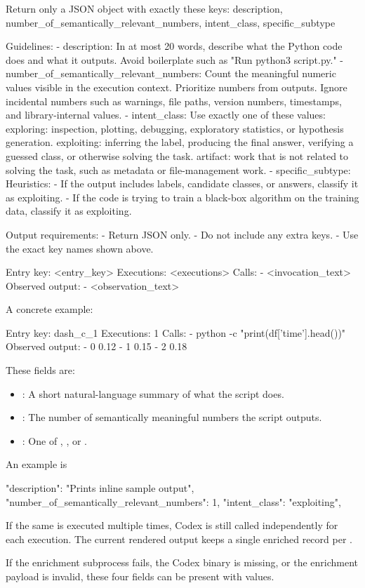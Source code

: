 \documentclass[11pt]{article}
\begin{document}
\begin{DocCode}
Return only a JSON object with exactly these keys:
description, number_of_semantically_relevant_numbers, intent_class, specific_subtype

Guidelines:
- description: In at most 20 words, describe what the Python code does and what it outputs. Avoid boilerplate such as "Run python3 script.py."
- number_of_semantically_relevant_numbers: Count the meaningful numeric values visible in the execution context. Prioritize numbers from outputs. Ignore incidental numbers such as warnings, file paths, version numbers, timestamps, and library-internal values.
- intent_class: Use exactly one of these values:
  exploring: inspection, plotting, debugging, exploratory statistics, or hypothesis generation.
  exploiting: inferring the label, producing the final answer, verifying a guessed class, or otherwise solving the task.
  artifact: work that is not related to solving the task, such as metadata or file-management work.
- specific_subtype: 
Heuristics:
- If the output includes labels, candidate classes, or answers, classify it as exploiting.
- If the code is trying to train a black-box algorithm on the training data, classify it as exploiting.


Output requirements:
- Return JSON only.
- Do not include any extra keys.
- Use the exact key names shown above.

Entry key: <entry_key>
Executions: <executions>
Calls:
- <invocation_text>
Observed output:
- <observation_text>
\end{DocCode}

A concrete example:

\begin{DocCode}
Entry key: dash_c_1
Executions: 1
Calls:
- python -c "print(df['time'].head())"
Observed output:
- 0    0.12
- 1    0.15
- 2    0.18
\end{DocCode}

These fields are:
\begin{itemize}
\item {}: A short natural-language summary of what the script does.
\item {}: The number of semantically meaningful numbers the script outputs.
\item {}: One of , , or .
\end{itemize}

An example is

\begin{DocCode}
"description": "Prints inline sample output",
"number_of_semantically_relevant_numbers": 1,
"intent_class": "exploiting",
\end{DocCode}


If the same  is executed multiple times, Codex is still called independently for each execution.
The current rendered output keeps a single enriched record per .

If the enrichment subprocess fails, the Codex binary is missing, or the enrichment payload is invalid, these four fields can be present with  values.
\end{document}
